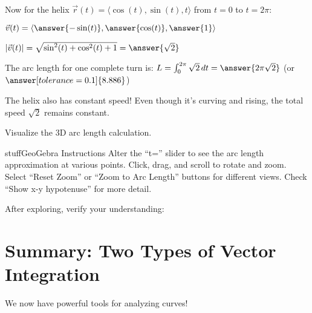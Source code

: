 \documentclass{ximera}
\begin{document}
\begin{problem}
Now for the helix $\vec{r}(t) = \langle \cos(t), \sin(t), t \rangle$ from $t=0$ to $t=2\pi$:

$\vec{v}(t) = \langle \answer{-\sin(t)}, \answer{\cos(t)}, \answer{1} \rangle$

$|\vec{v}(t)| = \sqrt{\sin^2(t) + \cos^2(t) + 1} = \answer{\sqrt{2}}$

The arc length for one complete turn is:
$L = \int_0^{2\pi} \sqrt{2} \, dt = \answer{2\pi\sqrt{2}}$ (or $\answer[tolerance=0.1]{8.886}$)

\begin{feedback}
The helix also has constant speed! Even though it's curving and rising, the total speed $\sqrt{2}$ remains constant.
\end{feedback}
\end{problem}

\begin{problem}
Visualize the 3D arc length calculation.

\begin{expandable}{stuff}{GeoGebra Instructions}
    Alter the ``t='' slider to see the arc length approximation at various points. Click, drag, and scroll to rotate and zoom. Select ``Reset Zoom'' or ``Zoom to Arc Length'' buttons for different views. Check ``Show x-y hypotenuse'' for more detail.
\end{expandable}

\begin{center}
\end{center}

After exploring, verify your understanding:
\begin{selectAll}
\end{selectAll}
\end{problem}

\section*{Summary: Two Types of Vector Integration}

We now have powerful tools for analyzing curves!
\end{document}
